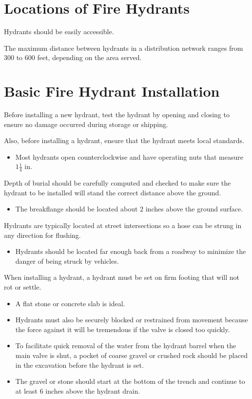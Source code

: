 \documentclass[10pt]{article}
\begin{document}
\section{Locations of Fire Hydrants}
Hydrants should be easily accessible.

The maximum distance between hydrants in a distribution network ranges from 300 to 600 feet, depending on the area served.

\section{Basic Fire Hydrant Installation}
Before installing a new hydrant, test the hydrant by opening and closing to ensure no damage occurred during storage or shipping.

Also, before installing a hydrant, ensure that the hydrant meets local standards.

\begin{itemize}
  \item Most hydrants open counterclockwise and have operating nuts that measure $1 \frac{1}{4}$ in.
\end{itemize}
Depth of burial should be carefully computed and checked to make sure the hydrant to be installed will stand the correct distance above the ground.

\begin{itemize}
  \item The breakflange should be located about 2 inches above the ground surface.
\end{itemize}
Hydrants are typically located at street intersections so a hose can be strung in any direction for flushing.

\begin{itemize}
  \item Hydrants should be located far enough back from a roadway to minimize the danger of being struck by vehicles.
\end{itemize}
When installing a hydrant, a hydrant must be set on firm footing that will not rot or settle.

\begin{itemize}
  \item A flat stone or concrete slab is ideal.

  \item Hydrants must also be securely blocked or restrained from movement because the force against it will be tremendous if the valve is closed too quickly.

  \item To facilitate quick removal of the water from the hydrant barrel when the main valve is shut, a pocket of coarse gravel or crushed rock should be placed in the excavation before the hydrant is set.

  \item The gravel or stone should start at the bottom of the trench and continue to at least 6 inches above the hydrant drain.

\end{itemize}
\end{document}
